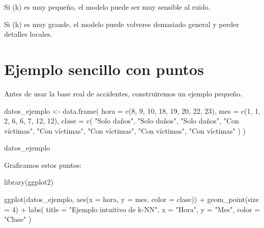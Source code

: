 \documentclass[
  11pt,
  letterpaper,
]{book}
\newenvironment{Shaded}{\begin{snugshade}}{\end{snugshade}}
\newcommand{\AttributeTok}[1]{\textcolor[rgb]{0.40,0.45,0.13}{#1}}
\newcommand{\DecValTok}[1]{\textcolor[rgb]{0.68,0.00,0.00}{#1}}
\newcommand{\FunctionTok}[1]{\textcolor[rgb]{0.28,0.35,0.67}{#1}}
\newcommand{\NormalTok}[1]{\textcolor[rgb]{0.00,0.23,0.31}{#1}}
\newcommand{\OtherTok}[1]{\textcolor[rgb]{0.00,0.23,0.31}{#1}}
\newcommand{\SpecialCharTok}[1]{\textcolor[rgb]{0.37,0.37,0.37}{#1}}
\newcommand{\StringTok}[1]{\textcolor[rgb]{0.13,0.47,0.30}{#1}}
\begin{document}
Si (k) es muy pequeño, el modelo puede ser muy sensible al ruido.

Si (k) es muy grande, el modelo puede volverse demasiado general y
perder detalles locales.

\section{Ejemplo sencillo con puntos}\label{ejemplo-sencillo-con-puntos}

Antes de usar la base real de accidentes, construiremos un ejemplo
pequeño.

\begin{Shaded}
\begin{Highlighting}[]
\NormalTok{datos\_ejemplo }\OtherTok{\textless{}{-}} \FunctionTok{data.frame}\NormalTok{(}
  \AttributeTok{hora =} \FunctionTok{c}\NormalTok{(}\DecValTok{8}\NormalTok{, }\DecValTok{9}\NormalTok{, }\DecValTok{10}\NormalTok{, }\DecValTok{18}\NormalTok{, }\DecValTok{19}\NormalTok{, }\DecValTok{20}\NormalTok{, }\DecValTok{22}\NormalTok{, }\DecValTok{23}\NormalTok{),}
  \AttributeTok{mes =} \FunctionTok{c}\NormalTok{(}\DecValTok{1}\NormalTok{, }\DecValTok{1}\NormalTok{, }\DecValTok{2}\NormalTok{, }\DecValTok{6}\NormalTok{, }\DecValTok{6}\NormalTok{, }\DecValTok{7}\NormalTok{, }\DecValTok{12}\NormalTok{, }\DecValTok{12}\NormalTok{),}
  \AttributeTok{clase =} \FunctionTok{c}\NormalTok{(}
    \StringTok{"Solo daños"}\NormalTok{, }\StringTok{"Solo daños"}\NormalTok{, }\StringTok{"Solo daños"}\NormalTok{,}
    \StringTok{"Con víctimas"}\NormalTok{, }\StringTok{"Con víctimas"}\NormalTok{, }\StringTok{"Con víctimas"}\NormalTok{,}
    \StringTok{"Con víctimas"}\NormalTok{, }\StringTok{"Con víctimas"}
\NormalTok{  )}
\NormalTok{)}

\NormalTok{datos\_ejemplo}
\end{Highlighting}
\end{Shaded}

Graficamos estos puntos:

\begin{Shaded}
\begin{Highlighting}[]
\FunctionTok{library}\NormalTok{(ggplot2)}

\FunctionTok{ggplot}\NormalTok{(datos\_ejemplo, }\FunctionTok{aes}\NormalTok{(}\AttributeTok{x =}\NormalTok{ hora, }\AttributeTok{y =}\NormalTok{ mes, }\AttributeTok{color =}\NormalTok{ clase)) }\SpecialCharTok{+}
  \FunctionTok{geom\_point}\NormalTok{(}\AttributeTok{size =} \DecValTok{4}\NormalTok{) }\SpecialCharTok{+}
  \FunctionTok{labs}\NormalTok{(}
    \AttributeTok{title =} \StringTok{"Ejemplo intuitivo de k{-}NN"}\NormalTok{,}
    \AttributeTok{x =} \StringTok{"Hora"}\NormalTok{,}
    \AttributeTok{y =} \StringTok{"Mes"}\NormalTok{,}
    \AttributeTok{color =} \StringTok{"Clase"}
\NormalTok{  )}
\end{Highlighting}
\end{Shaded}
\end{document}

